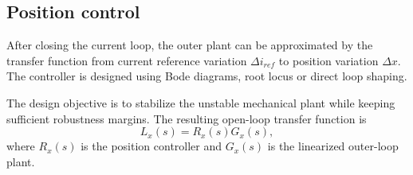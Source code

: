 \subsection{Position control}

After closing the current loop, the outer plant can be approximated by the transfer function from current reference variation $\Delta i_{ref}$ to position variation $\Delta x$. The controller is designed using Bode diagrams, root locus or direct loop shaping.

The design objective is to stabilize the unstable mechanical plant while keeping sufficient robustness margins. The resulting open-loop transfer function is
\begin{equation}
    L_x(s) = R_x(s)G_x(s),
\end{equation}
where $R_x(s)$ is the position controller and $G_x(s)$ is the linearized outer-loop plant.
